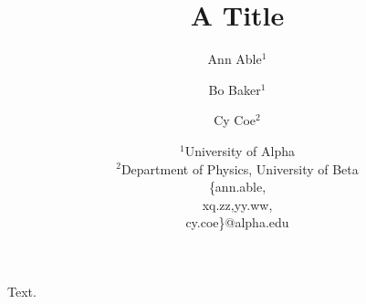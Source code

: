 \documentclass{article}
\title{A Title}
\author{%
  Ann Able$^{1}$ \\
  \and
  Bo Baker$^{1}$ \\
  \and
  Cy Coe$^{2}$ \\
  \and
 {\normalfont $^1$University of Alpha} \\
 {\normalfont $^2$Department of Physics, University of Beta} \\
 \{ann.able,\\
 xq.zz,yy.ww,\\
 cy.coe\}@alpha.edu
}
\begin{document}
\maketitle
Text.
\end{document}

